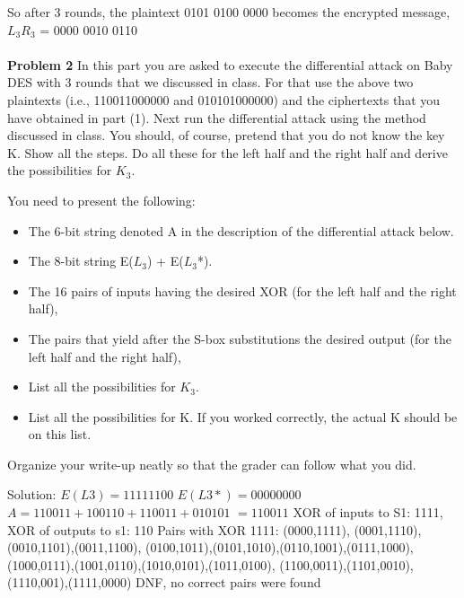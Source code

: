 \documentclass[12pt,letterpaper,final]{report}
\begin{document}
So after 3 rounds, the plaintext 0101 0100 0000 becomes the encrypted message, $L_3R_3$ = 0000 0010 0110 \\
 \\


\bigskip\noindent\textbf{Problem 2} In this part you are asked to execute the differential attack on Baby DES with 3 rounds that we discussed in class. For that use the above two plaintexts  (i.e., 110011000000 and 010101000000) and the ciphertexts that you have obtained in part (1).  Next run the differential attack using the method discussed in class.  You should, of course, pretend that you do not know the key K.  Show all the steps.  Do all these for the left half and the right half and derive the possibilities for $K_3$. 
\bigskip

You need to present the following:

\begin{itemize}
	\item The 6-bit string denoted A in the description of the differential attack below.
	\item The 8-bit string E($L_3$) + E($L_3$*). 
	\item The 16 pairs of inputs having the desired XOR (for the left half and the right half), 
	\item The pairs that yield after the S-box substitutions the desired output (for the left half and the right half),
	\item List all the possibilities for $K_3$.
	\item List all the possibilities for K. If you worked correctly, the actual K should be on this list.
\end{itemize}

Organize your write-up neatly so that the grader can follow what you did.


\bigskip Solution: 
\newline $E(L3) = 1111 1100$
\newline $E(L3*) = 0000 0000$
\newline $A = 110011 + 100110 + 110011 + 010101$
\newline $= 110011$
\newline XOR of inputs to S1: 1111, XOR of outputs to s1: 110
\newline Pairs with XOR 1111:
\newline (0000,1111), (0001,1110),(0010,1101),(0011,1100),
\newline (0100,1011),(0101,1010),(0110,1001),(0111,1000),
\newline (1000,0111),(1001,0110),(1010,0101),(1011,0100),
\newline (1100,0011),(1101,0010),(1110,001),(1111,0000)
\newline DNF, no correct pairs were found
\end{document}
